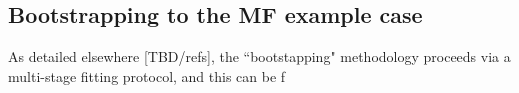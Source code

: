 \subsection{Bootstrapping to the MF example case}

As detailed elsewhere [TBD/refs], the ``bootstapping" methodology proceeds via a multi-stage fitting protocol, and this can be f